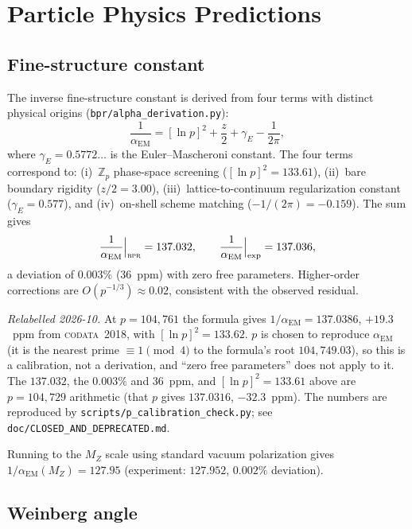 \documentclass[aps,prd,twocolumn,superscriptaddress,longbibliography,nofootinbib]{revtex4-2}
\newcommand{\Zp}{\mathbb{Z}_p}
\newcommand{\alphaEM}{\alpha_{\mathrm{EM}}}
\newcommand{\MZ}{M_Z}
\newcommand{\bpr}{\textsc{bpr}}
\begin{document}
\section{Particle Physics Predictions}
\label{sec:particle}

\subsection{Fine-structure constant}

The inverse fine-structure constant is derived from four terms with
distinct physical origins (\texttt{bpr/alpha\_derivation.py}):
\begin{equation}
\frac{1}{\alphaEM} = [\ln p]^2 + \frac{z}{2} + \gamma_E
  - \frac{1}{2\pi},
\label{eq:alpha}
\end{equation}
where $\gamma_E = 0.5772\ldots$ is the Euler--Mascheroni constant.
The four terms correspond to: (i)~$\Zp$ phase-space screening
($[\ln p]^2 = 133.61$), (ii)~bare boundary rigidity ($z/2 = 3.00$),
(iii)~lattice-to-continuum regularization constant ($\gamma_E =
0.577$), and (iv)~on-shell scheme matching ($-1/(2\pi) = -0.159$).
The sum gives
\begin{equation}
\frac{1}{\alphaEM}\Big|_{\bpr} = 137.032, \qquad
\frac{1}{\alphaEM}\Big|_{\mathrm{exp}} = 137.036,
\label{eq:alpha_value}
\end{equation}
a deviation of $0.003\%$ (36~ppm) with zero free parameters.
Higher-order corrections are $O(p^{-1/3}) \approx 0.02$, consistent
with the observed residual.

\textit{Relabelled 2026-10.}  At $p = 104{,}761$ the formula gives
$1/\alphaEM = 137.0386$, $+19.3$~ppm from \textsc{codata}~2018, with
$[\ln p]^2 = 133.62$.  $p$ is chosen to reproduce $\alphaEM$ (it is the
nearest prime $\equiv 1 \pmod 4$ to the formula's root $104{,}749.03$),
so this is a calibration, not a derivation, and ``zero free
parameters'' does not apply to it.  The $137.032$, the $0.003\%$ and
$36$~ppm, and $[\ln p]^2 = 133.61$ above are $p = 104{,}729$ arithmetic
(that $p$ gives $137.0316$, $-32.3$~ppm).  The numbers are reproduced
by \texttt{scripts/p\_calibration\_check.py}; see
\texttt{doc/CLOSED\_AND\_DEPRECATED.md}.

Running to the $\MZ$ scale using standard vacuum polarization gives
$1/\alphaEM(\MZ) = 127.95$ (experiment: $127.952$, $0.002\%$
deviation).

\subsection{Weinberg angle}
\end{document}
